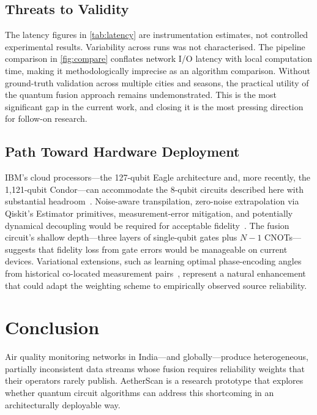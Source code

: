 \documentclass[conference]{IEEEtran}
\begin{document}
\subsection{Threats to Validity}\label{subsec:threats}

The latency figures in \cref{tab:latency} are instrumentation estimates,
not controlled experimental results.
Variability across runs was not characterised.
The pipeline comparison in \cref{fig:compare} conflates network I/O
latency with local computation time, making it methodologically imprecise
as an algorithm comparison.
Without ground-truth validation across multiple cities and seasons, the
practical utility of the quantum fusion approach remains undemonstrated.
This is the most significant gap in the current work, and closing it is
the most pressing direction for follow-on research.

\subsection{Path Toward Hardware Deployment}

IBM's cloud processors---the 127-qubit Eagle architecture and, more
recently, the 1,121-qubit Condor---can accommodate the 8-qubit circuits
described here with substantial headroom~\cite{javadi2024qiskit}.
Noise-aware transpilation, zero-noise extrapolation via Qiskit's
Estimator primitives, measurement-error mitigation, and potentially
dynamical decoupling would be required for acceptable
fidelity~\cite{cerezo2021variational,kandala2017hardware}.
The fusion circuit's shallow depth---three layers of single-qubit gates
plus $N{-}1$ CNOTs---suggests that fidelity loss from gate errors would
be manageable on current devices.
Variational extensions, such as learning optimal phase-encoding angles
from historical co-located measurement pairs~\cite{cerezo2021variational},
represent a natural enhancement that could adapt the weighting scheme
to empirically observed source reliability.


\section{Conclusion}\label{sec:conclude}

Air quality monitoring networks in India---and globally---produce
heterogeneous, partially inconsistent data streams whose fusion requires
reliability weights that their operators rarely publish.
AetherScan is a research prototype that explores whether quantum circuit
algorithms can address this shortcoming in an architecturally deployable
way.
\end{document}
